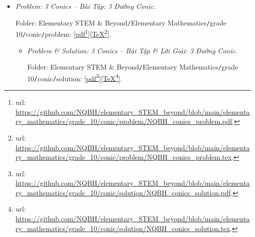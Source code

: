 \documentclass[12pt]{article}
\begin{document}
\begin{itemize}
\begin{itemize}
		Folder: {\sf Elementary STEM \& Beyond{\tt/}Elementary Mathematics{\tt/}grade 10{\tt/}induction{\tt/}solution}: [\href{https://github.com/NQBH/elementary_STEM_beyond/blob/main/elementary_mathematics/grade_10/induction/solution/NQBH_mathematical_induction_solution.pdf}{pdf}\footnote{{\sc url}: \url{https://github.com/NQBH/elementary_STEM_beyond/blob/main/elementary_mathematics/grade_10/induction/solution/NQBH_mathematical_induction_solution.pdf}.}][\href{https://github.com/NQBH/elementary_STEM_beyond/blob/main/elementary_mathematics/grade_10/induction/solution/NQBH_mathematical_induction_solution.tex}{\TeX}\footnote{{\sc url}: \url{https://github.com/NQBH/elementary_STEM_beyond/blob/main/elementary_mathematics/grade_10/induction/solution/NQBH_mathematical_induction_solution.tex}.}].
	\end{itemize}
	\item {\it Problem: 3 Conics -- Bài Tập: 3 Đường Conic}.
	
	Folder: {\sf Elementary STEM \& Beyond{\tt/}Elementary Mathematics{\tt/}grade 10{\tt/}conic{\tt/}problem}: [\href{https://github.com/NQBH/elementary_STEM_beyond/blob/main/elementary_mathematics/grade_10/conic/problem/NQBH_conics_problem.pdf}{pdf}\footnote{{\sc url}: \url{https://github.com/NQBH/elementary_STEM_beyond/blob/main/elementary_mathematics/grade_10/conic/problem/NQBH_conics_problem.pdf}.}][\href{https://github.com/NQBH/elementary_STEM_beyond/blob/main/elementary_mathematics/grade_10/conic/problem/NQBH_conics_problem.tex}{\TeX}\footnote{{\sc url}: \url{https://github.com/NQBH/elementary_STEM_beyond/blob/main/elementary_mathematics/grade_10/conic/problem/NQBH_conics_problem.tex}.}].
	\begin{itemize}
		\item {\it Problem \& Solution: 3 Conics -- Bài Tập \& Lời Giải: 3 Đường Conic}.
		
		Folder: {\sf Elementary STEM \& Beyond{\tt/}Elementary Mathematics{\tt/}grade 10{\tt/}conic{\tt/}solution}: [\href{https://github.com/NQBH/elementary_STEM_beyond/blob/main/elementary_mathematics/grade_10/conic/solution/NQBH_conics_solution.pdf}{pdf}\footnote{{\sc url}: \url{https://github.com/NQBH/elementary_STEM_beyond/blob/main/elementary_mathematics/grade_10/conic/solution/NQBH_conics_solution.pdf}.}][\href{https://github.com/NQBH/elementary_STEM_beyond/blob/main/elementary_mathematics/grade_10/conic/solution/NQBH_conics_solution.tex}{\TeX}\footnote{{\sc url}: \url{https://github.com/NQBH/elementary_STEM_beyond/blob/main/elementary_mathematics/grade_10/conic/solution/NQBH_conics_solution.tex}.}].
	\end{itemize}
\end{itemize}
\end{document}
